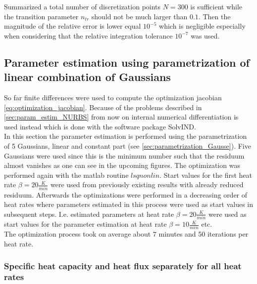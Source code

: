 \documentclass{scrartcl}[12pt, halfparskip]
\numberwithin{equation}{section}
\numberwithin{figure}{section}
\numberwithin{table}{section}
\begin{document}
Summarized a total number of discretization points $N=300$ is sufficient while the transition parameter $n_{tr}$ should not be much larger than $0.1$. Then the magnitude of the relative error is lower equal $10^{-5}$ which is negligible especially when considering that the relative integration tolerance $10^{-7}$ was used.




\subsection{Parameter estimation using parametrization of linear combination of Gaussians}
\label{sec:param_estimation_5Gausse}
So far finite differences were used to compute the optimization jacobian \cref{eq:optimization_jacobian}. Because of the problems described in \cref{sec:param_estim_NURBS} from now on internal numerical differentiation is used instead which is done with the software package SolvIND. \\
In this section the parameter estimation is performed using the parametrization of 5 Gaussians, linear and constant part (see \cref{sec:parametrization_Gausse}). Five Gaussians were used since this is the minimum number such that the residuum almost vanishes as one can see in the upcoming figures. The optimization was performed again with the matlab routine $lsqnonlin$. Start values for the first heat rate $\beta = 20 \frac{K}{min}$ were used from previously existing results with already reduced residuum. Afterwards the optimizations were performed in a decreasing order of heat rates where parameters estimated in this process were used as start values in subsequent steps. I.e. estimated parameters at heat rate $\beta=20 \frac{K}{min}$ were used as start values for the parameter estimation at heat rate $\beta=10 \frac{K}{min}$ etc. \\
The optimization process took on average about $7$ minutes and 50 iterations per heat rate.

\subsubsection{Specific heat capacity and heat flux separately for all heat rates}
\end{document}
